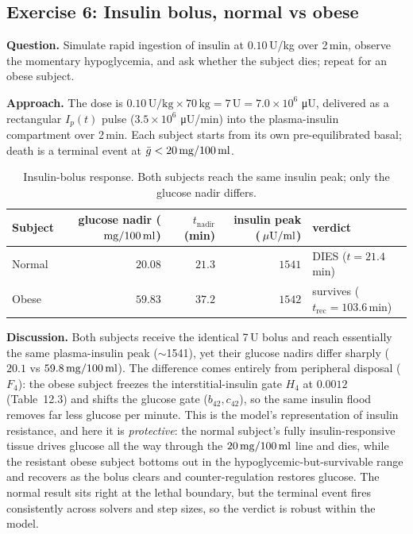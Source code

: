 \subsection{Exercise 6: Insulin bolus, normal vs obese}

\textbf{Question.} Simulate rapid ingestion of insulin at $0.10$\,U/kg over 2\,min, observe the
momentary hypoglycemia, and ask whether the subject dies; repeat for an obese subject.

\textbf{Approach.} The dose is $0.10\,\text{U/kg}\times70\,\text{kg}=7\,\text{U}=7.0\times10^{6}$
\si{\micro U}, delivered as a rectangular $I_p(t)$ pulse ($3.5\times10^{6}$ \si{\micro U}/min) into the
plasma-insulin compartment over 2\,min. Each subject starts from its own pre-equilibrated basal; death
is a terminal event at $\bar{g}<20\,\mathrm{mg}/100\,\mathrm{ml}$.

\begin{table}[H]
\centering
\caption{Insulin-bolus response. Both subjects reach the same insulin peak; only the glucose nadir
differs.}
\label{tab:ex6}
\begin{tabular}{lrrrl}
\toprule
Subject & glucose nadir ($\,\mathrm{mg}/100\,\mathrm{ml}$) & $t_{\mathrm{nadir}}$ (min) & insulin peak ($\,\mu\mathrm{U}/\mathrm{ml}$) & verdict \\
\midrule
Normal & $20.08$ & $21.3$ & $1541$ & DIES ($t=21.4$\,min) \\
Obese & $59.83$ & $37.2$ & $1542$ & survives ($t_{\mathrm{rec}}=103.6$\,min) \\
\bottomrule
\end{tabular}
\end{table}

\textbf{Discussion.} Both subjects receive the identical 7\,U bolus and reach essentially the same
plasma-insulin peak ($\sim$1541\uU), yet their glucose nadirs differ sharply ($20.1$ vs $59.8\,\mathrm{mg}/100\,\mathrm{ml}$).
The difference comes entirely from peripheral disposal ($F_4$): the obese subject freezes the
interstitial-insulin gate $H_4$ at $0.0012$ (Table~12.3) and shifts the glucose gate ($b_{42},c_{42}$),
so the same insulin flood removes far less glucose per minute. This is the model's representation of
insulin resistance, and here it is \emph{protective}: the normal subject's fully insulin-responsive
tissue drives glucose all the way through the $20\,\mathrm{mg}/100\,\mathrm{ml}$ line and dies, while the resistant obese subject
bottoms out in the hypoglycemic-but-survivable range and recovers as the bolus clears and
counter-regulation restores glucose. The normal result sits right at the lethal boundary, but the
terminal event fires consistently across solvers and step sizes, so the verdict is robust within the
model.

